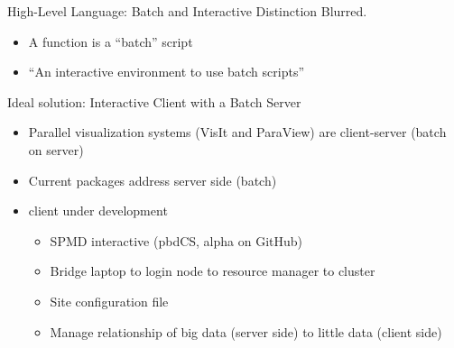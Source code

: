 \begin{frame}
  \begin{block}{High-Level Language: Batch and Interactive Distinction Blurred.}
    \begin{itemize}
    \item A function is a ``batch'' script
    \item \R ``An interactive environment to use batch scripts''
    \end{itemize}
  \end{block}
  \begin{block}{Ideal solution: Interactive Client with a Batch
      Server} 
    \begin{itemize}
    \item Parallel visualization systems (VisIt and ParaView) are
      client-server (batch on server)
    \item Current \pbdR packages address server side (batch)
    \item \pbdR client under development
      \begin{itemize}
      \item SPMD interactive (pbdCS, alpha on GitHub)
      \item Bridge laptop to login node to resource manager to cluster
      \item Site configuration file
      \item Manage relationship of big data (server side) to little
        data (client side)
      \end{itemize}
    \end{itemize}
  \end{block}
\end{frame}

